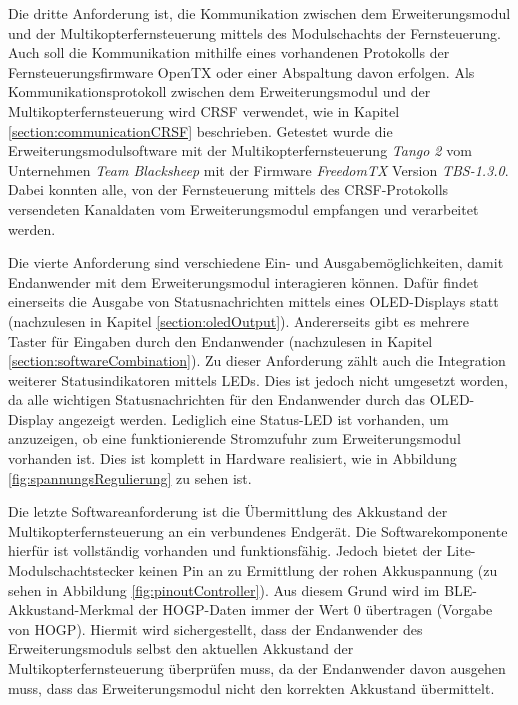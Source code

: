 Die dritte Anforderung ist, die Kommunikation zwischen dem Erweiterungsmodul und der Multikopterfernsteuerung mittels des Modulschachts der Fernsteuerung. Auch soll die Kommunikation mithilfe eines vorhandenen Protokolls der Fernsteuerungsfirmware OpenTX oder einer Abspaltung davon erfolgen. Als Kommunikationsprotokoll zwischen dem Erweiterungsmodul und der Multikopterfernsteuerung wird CRSF verwendet, wie in Kapitel \ref{section:communicationCRSF} beschrieben. Getestet wurde die Erweiterungsmodulsoftware mit der Multikopterfernsteuerung \textit{Tango 2} vom Unternehmen \textit{Team Blacksheep} mit der Firmware \textit{FreedomTX} Version \textit{TBS-1.3.0}. Dabei konnten alle, von der Fernsteuerung mittels des CRSF-Protokolls versendeten Kanaldaten vom Erweiterungsmodul empfangen und verarbeitet werden.

Die vierte Anforderung sind verschiedene Ein- und Ausgabemöglichkeiten, damit Endanwender mit dem Erweiterungsmodul interagieren können. Dafür findet einerseits die Ausgabe von Statusnachrichten mittels eines \acs{OLED}-Displays statt (nachzulesen in Kapitel \ref{section:oledOutput}). Andererseits gibt es mehrere Taster für Eingaben durch den Endanwender (nachzulesen in Kapitel \ref{section:softwareCombination}). Zu dieser Anforderung zählt auch die Integration weiterer Statusindikatoren mittels \acsp{LED}. Dies ist jedoch nicht umgesetzt worden, da alle wichtigen Statusnachrichten für den Endanwender durch das \acs{OLED}-Display angezeigt werden. Lediglich eine Status-\acs{LED} ist vorhanden, um anzuzeigen, ob eine funktionierende Stromzufuhr zum Erweiterungsmodul vorhanden ist. Dies ist komplett in Hardware realisiert, wie in Abbildung \ref{fig:spannungsRegulierung} zu sehen ist.

Die letzte Softwareanforderung ist die Übermittlung des Akkustand der Multikopterfernsteuerung an ein verbundenes Endgerät. Die Softwarekomponente hierfür ist vollständig vorhanden und funktionsfähig. Jedoch bietet der Lite-Modulschachtstecker keinen Pin an zu Ermittlung der rohen Akkuspannung (zu sehen in Abbildung \ref{fig:pinoutController}). Aus diesem Grund wird im \ac{BLE}-Akkustand-Merkmal der \ac{HOGP}-Daten immer der Wert 0 übertragen (Vorgabe von \ac{HOGP}). Hiermit wird sichergestellt, dass der Endanwender des Erweiterungsmoduls selbst den aktuellen Akkustand der Multikopterfernsteuerung überprüfen muss, da der Endanwender davon ausgehen muss, dass das Erweiterungsmodul nicht den korrekten Akkustand übermittelt.

